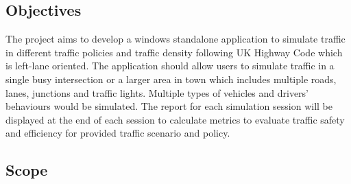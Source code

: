 \documentclass[11pt]{article}
\begin{document}
\subsection{Objectives}
The project aims to develop a windows standalone application to simulate traffic in different traffic policies and traffic density following UK Highway Code which is left-lane oriented. The application should allow users to simulate traffic in a single busy intersection or a larger area in town which includes multiple roads, lanes, junctions and traffic lights. Multiple types of vehicles and drivers' behaviours would be simulated. The report for each simulation session will be displayed at the end of each session to calculate metrics to evaluate traffic safety and efficiency for provided traffic scenario and policy.




\subsection{Scope}
\end{document}
